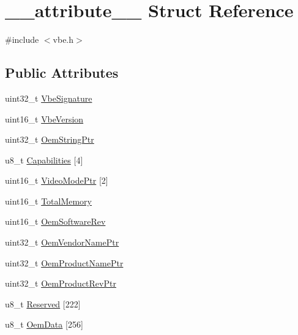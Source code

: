 \hypertarget{struct____attribute____}{}\section{\+\_\+\+\_\+attribute\+\_\+\+\_\+ Struct Reference}
\label{struct____attribute____}


{\ttfamily \#include $<$vbe.\+h$>$}

\subsection*{Public Attributes}
\begin{DoxyCompactItemize}
\item 
uint32\+\_\+t \hyperlink{struct____attribute_____aae97bc03200134a557339f79aeeea94e}{Vbe\+Signature}
\item 
uint16\+\_\+t \hyperlink{struct____attribute_____ab50a7a6ed578c30d9411db043c0b34c9}{Vbe\+Version}
\item 
uint32\+\_\+t \hyperlink{struct____attribute_____acc74a7d7f3d3d90bc058f13f4d30a61c}{Oem\+String\+Ptr}
\item 
u8\+\_\+t \hyperlink{struct____attribute_____a22a17ae44df67e1ebae6eb2721b64279}{Capabilities} \mbox{[}4\mbox{]}
\item 
uint16\+\_\+t \hyperlink{struct____attribute_____a135a4de316befee6c1415c22e5636f15}{Video\+Mode\+Ptr} \mbox{[}2\mbox{]}
\item 
uint16\+\_\+t \hyperlink{struct____attribute_____a5659e88b961bf423d6385f315264e005}{Total\+Memory}
\item 
uint16\+\_\+t \hyperlink{struct____attribute_____abd3b5364844ce7019b91c129b5535f42}{Oem\+Software\+Rev}
\item 
uint32\+\_\+t \hyperlink{struct____attribute_____ad8741201b5c9013911dd092185d780b6}{Oem\+Vendor\+Name\+Ptr}
\item 
uint32\+\_\+t \hyperlink{struct____attribute_____a79d41d28ea7c0aa5c8f36e46c92ee2d0}{Oem\+Product\+Name\+Ptr}
\item 
uint32\+\_\+t \hyperlink{struct____attribute_____aa746b73bc137e19abbbac805a97594b9}{Oem\+Product\+Rev\+Ptr}
\item 
u8\+\_\+t \hyperlink{struct____attribute_____a7d9d8bf3e618f409748302e3d2484fe6}{Reserved} \mbox{[}222\mbox{]}
\item 
u8\+\_\+t \hyperlink{struct____attribute_____ac3f69bedeb0dc55c1ee1bd481a74b08e}{Oem\+Data} \mbox{[}256\mbox{]}
\item 

\end{DoxyCompactItemize}

